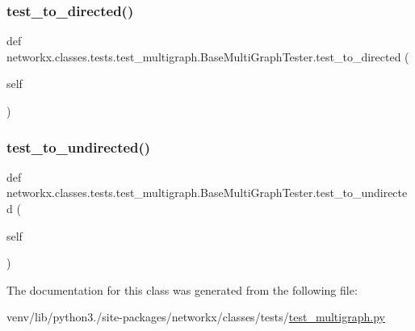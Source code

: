 \subsubsection{\texorpdfstring{test\+\_\+to\+\_\+directed()}{test\_to\_directed()}}
{\footnotesize\ttfamily def networkx.\+classes.\+tests.\+test\+\_\+multigraph.\+Base\+Multi\+Graph\+Tester.\+test\+\_\+to\+\_\+directed (\begin{DoxyParamCaption}\item[{}]{self }\end{DoxyParamCaption})}

\mbox{\label{classnetworkx_1_1classes_1_1tests_1_1test__multigraph_1_1BaseMultiGraphTester_a82a7c963bfbc8b6efc6a8dba50d050a9}} 
\subsubsection{\texorpdfstring{test\+\_\+to\+\_\+undirected()}{test\_to\_undirected()}}
{\footnotesize\ttfamily def networkx.\+classes.\+tests.\+test\+\_\+multigraph.\+Base\+Multi\+Graph\+Tester.\+test\+\_\+to\+\_\+undirected (\begin{DoxyParamCaption}\item[{}]{self }\end{DoxyParamCaption})}



The documentation for this class was generated from the following file\+:\begin{DoxyCompactItemize}
\item 
venv/lib/python3./site-\/packages/networkx/classes/tests/\hyperlink{test__multigraph_8py}{test\+\_\+multigraph.\+py}\end{DoxyCompactItemize}
